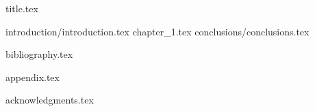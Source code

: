 \documentclass[a4paper,12pt,twoside,titlepage]{book}
\begin{document}

{title.tex}

{introduction/introduction.tex}
{chapter_1.tex}
{conclusions/conclusions.tex}

{bibliography.tex}

{appendix.tex}

{acknowledgments.tex}
\end{document}
